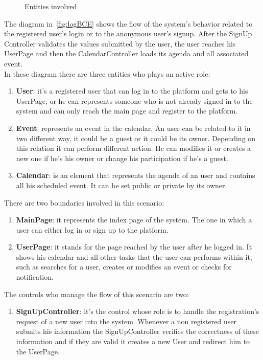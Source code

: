 \begin{itemize}
\begin{center}
\begin{figure}[H]
    \caption{Entities involved}
     \label{fig:entityovervie}
     \end{figure}
   \end{center}  


The diagram in~\ref{fig:logBCE} shows the flow of the system's behavior related to the registered user's login or to the anonymous user's signup. After the SignUp Controller validates the values submitted by the user, the user reaches his UserPage and then the CalendarController loads its agenda and all associated event. \\In these diagram there are three entities who plays an active role:
\begin{enumerate}
\item  {\bf User}: it's a registered user that can log in to the platform and gets to his UserPage, or he can represents someone who is not already signed in  to the system and can only reach the main page and register to the platform.
\item  {\bf Event}: represents an event in the calendar. An user can be related to it in two different way, it could be a guest or it could be its owner. Depending on this relation it can perform different action. He can modifies it or creates a new one if he's his owner or change his participation if he's a guest.
\item  {\bf Calendar}: is an element that represents the agenda of an user and contains all his scheduled event. It can be set public or private by its owner.
\end{enumerate}
There are two boundaries involved in this scenario: \begin{enumerate}
\item {\bf MainPage}: it represents the index page of the system. The one in which a user can either log in or sign up to the platform.
\item {\bf UserPage}: it stands for the page reached by the user after he logged in. It shows his calendar and all other tasks that the user can performs within it, such as searches for a user, creates or modifies an event or checks for notification.
 \end{enumerate}
The controls who manage the flow of this scenario are two:\begin{enumerate}
\item {\bf SignUpController}: it's the control whose role is to handle the registration's request of a new user into the system. Whenever a non registered user submits his information the SignUpController verifies the correctness of these information and if they are valid it creates a new User and redirect him to the UserPage.

\end{enumerate}
\end{itemize}
